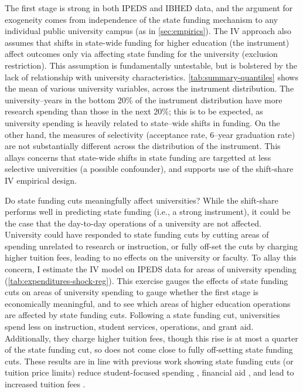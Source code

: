 The first stage is strong in both IPEDS and IBHED data, and the argument for exogeneity comes from independence of the state funding mechanism to any individual public university campus (as in \autoref{sec:empirics}).
The IV approach also assumes that shifts in state-wide funding for higher education (the instrument) affect outcomes only via affecting state funding for the university (exclusion restriction).
This assumption is fundamentally untestable, but is bolstered by the lack of relationship with university characteristics.
\autoref{tab:summary-quantiles} shows the mean of various university variables, across the instrument distribution.
The university--years in the bottom 20\% of the instrument distribution have more research spending than those in the next 20\%; this is to be expected, as university spending is heavily related to state--wide shifts in funding.
On the other hand, the measures of selectivity (acceptance rate, 6--year graduation rate) are not substantially different across the distribution of the instrument.
This allays concerns that state-wide shifts in state funding are targetted at less selective universities (a possible confounder), and supports use of the shift-share IV empirical design.

Do state funding cuts meaningfully affect universities?
While the shift-share performs well in predicting state funding (i.e., a strong instrument), it could be the case that the day-to-day operations of a university are not affected.
University could have responded to state funding cuts by cutting areas of spending unrelated to research or instruction, or fully off-set the cuts by charging higher tuition fees, leading to no effects on the university or faculty.
To allay this concern, I estimate the IV model on IPEDS data for areas of university spending  (\autoref{tab:expenditures-shock-reg}).
This exercise gauges the effects of state funding cuts on areas of university spending to gauge whether the first stage is economically meaningful, and to see which areas of higher education operations are affected by state funding cuts.
Following a state funding cut, universities spend less on instruction, student services, operations, and grant aid.
Additionally, they charge higher tuition fees, though this rise is at most a quarter of the state funding cut, so does not come close to fully off-setting state funding cuts.
These results are in line with previous work showing state funding cuts (or tuition price limits) reduce student-focused spending \citep{NBERw23736}, financial aid \citep{miller2022making}, and lead to increased tuition fees \citep{bound2019public}.

